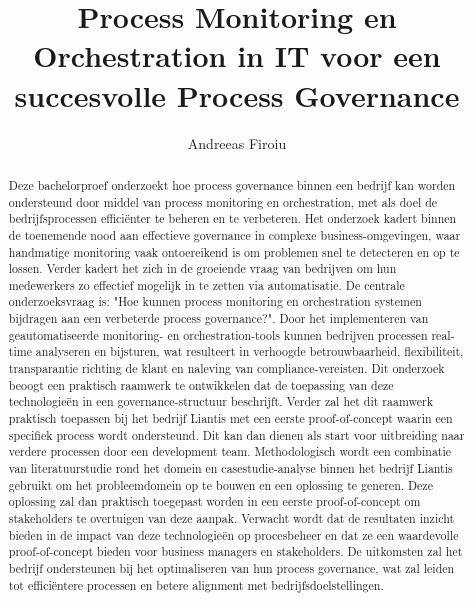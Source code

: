 \documentclass{hogent-article}
\title{Process Monitoring en Orchestration in IT voor een succesvolle Process Governance}
\author{Andreeas Firoiu}
\begin{document}
\begin{abstract}
  Deze bachelorproef onderzoekt hoe process governance binnen een bedrijf kan worden ondersteund door middel van process monitoring en orchestration, met als doel de bedrijfsprocessen efficiënter te beheren en te verbeteren. Het onderzoek kadert binnen de toenemende nood aan effectieve governance in complexe business-omgevingen, waar handmatige monitoring vaak ontoereikend is om problemen snel te detecteren en op te lossen. Verder kadert het zich in de groeiende vraag van bedrijven om hun medewerkers zo effectief mogelijk in te zetten via automatisatie. De centrale onderzoeksvraag is: "Hoe kunnen process monitoring en orchestration systemen bijdragen aan een verbeterde process governance?". Door het implementeren van geautomatiseerde monitoring- en orchestration-tools kunnen bedrijven processen real-time analyseren en bijsturen, wat resulteert in verhoogde betrouwbaarheid, flexibiliteit, transparantie richting de klant en naleving van compliance-vereisten. Dit onderzoek beoogt een praktisch raamwerk te ontwikkelen dat de toepassing van deze technologieën in een governance-structuur beschrijft. Verder zal het dit raamwerk praktisch toepassen bij het bedrijf Liantis met een eerste proof-of-concept waarin een specifiek process wordt ondersteund. Dit kan dan dienen als start voor uitbreiding naar verdere processen door een development team. Methodologisch wordt een combinatie van literatuurstudie rond het domein en casestudie-analyse binnen het bedrijf Liantis gebruikt om het probleemdomein op te bouwen en een oplossing te generen. Deze oplossing zal dan praktisch toegepast worden in een eerste proof-of-concept om stakeholders te overtuigen van deze aanpak. Verwacht wordt dat de resultaten inzicht bieden in de impact van deze technologieën op procesbeheer en dat ze een waardevolle proof-of-concept bieden voor business managers en stakeholders. De uitkomsten zal het bedrijf ondersteunen bij het optimaliseren van hun process governance, wat zal leiden tot efficiëntere processen en betere alignment met bedrijfsdoelstellingen.
\end{abstract}

\tableofcontents



\printbibliography[heading=bibintoc]
\end{document}

